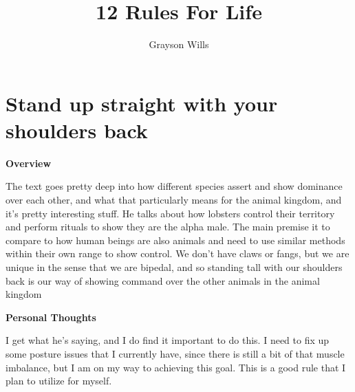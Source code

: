 \documentclass{article}
\title{12 Rules For Life}
\author{Grayson Wills}
\begin{document}
\maketitle

\section{Stand up straight with your shoulders back}
    \begin{multicols}{2}
        \begin{center}
            \textbf{Overview}
        \end{center}
        
        The text goes pretty deep into how different species assert and show dominance over each other, and what that particularly means for the animal kingdom, and it's pretty interesting stuff. He talks about how lobsters control their territory and perform rituals to show they are the alpha male. The main premise it to compare to how human beings are also animals and need to use similar methods within their own range to show control. We don't have claws or fangs, but we are unique in the sense that we are bipedal, and so standing tall with our shoulders back is our way of showing command over the other animals in the animal kingdom

        \begin{center}
            \textbf{Personal Thoughts}

        \end{center}
        

            I get what he's saying, and I do find it important to do this. I need to fix up some posture issues that I currently have, since there is still a bit of that muscle imbalance, but I am on my way to achieving this goal. This is a good rule that I plan to utilize for myself.
        
    \end{multicols}
 
\end{document}
